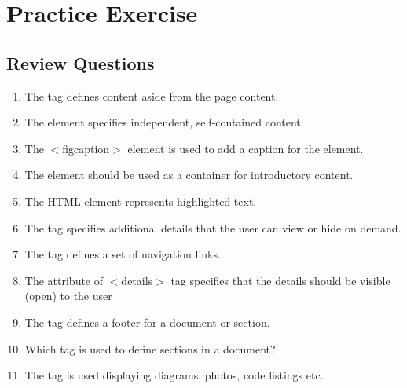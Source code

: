 \documentclass[11pt,a4paper]{article}
\begin{document}
\section*{Practice Exercise}
\subsection*{Review Questions}
\begin{enumerate}\itemsep10pt
\item The \underline{\hspace{2cm}} tag defines content aside from the page content.
\item The \underline{\hspace{2cm}} element specifies independent, self-contained content.
\item The $<$figcaption$>$ element is used to add a caption for the \underline{\hspace{2cm}} element.
\item The \underline{\hspace{2cm}} element should be used as a container for introductory content.
\item The HTML \underline{\hspace{2cm}} element represents highlighted text.
\item The \underline{\hspace{2cm}} tag specifies additional details that the user can view or hide on demand.
\item The \underline{\hspace{2cm}} tag defines a set of navigation links.
\item The \underline{\hspace{2cm}} attribute of $<$details$>$ tag specifies that the details should be visible (open) to the user
\item The \underline{\hspace{2cm}} tag defines a footer for a document or section.
\item Which tag is used to define sections in a document?\underline{\hspace{2cm}}
\item The \underline{\hspace{2cm}} tag is used displaying diagrams, photos, code listings etc.
\end{enumerate}
\end{document}
